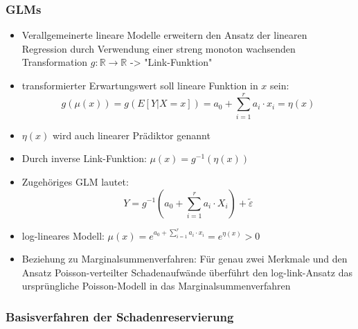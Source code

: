 \documentclass[12pt]{report}
\theoremstyle{dotless}
\theoremstyle{definition}
\begin{document}
\subsubsection{GLMs}
\begin{itemize}
\item Verallgemeinerte lineare Modelle erweitern den Ansatz der linearen Regression durch Verwendung einer streng monoton wachsenden Transformation $g: \mathbb{R} \rightarrow \mathbb{R}$ -> "Link-Funktion"
\item transformierter Erwartungswert soll lineare Funktion in $x$ sein:
\begin{equation}
g(\mu(x)) = g(E[Y|X=x]) = a_0 + \sum_{i=1}^r a_i \cdot x_i = \eta (x)
\end{equation}
\item $\eta(x)$ wird auch linearer Prädiktor genannt
\item Durch inverse Link-Funktion: $\mu(x) = g^{-1}(\eta(x))$
\item Zugehöriges GLM lautet:
\begin{equation}
Y=g^{-1} \left( a_0 + \sum_{i=1}^r a_i \cdot X_i \right) +\widetilde{\varepsilon}
\end{equation}
\item log-lineares Modell: $\mu(x) = e^{a_0 + \sum_{i=1}^r a_i \cdot x_i} = e^{\eta (x)} >0$ 
\item Beziehung zu Marginalsummenverfahren: Für genau zwei Merkmale und den Ansatz Poisson-verteilter Schadenaufwände überführt den log-link-Ansatz das ursprüngliche Poisson-Modell in das Marginalsummenverfahren 
\end{itemize}




\subsubsection{Basisverfahren der Schadenreservierung}
\end{document}
